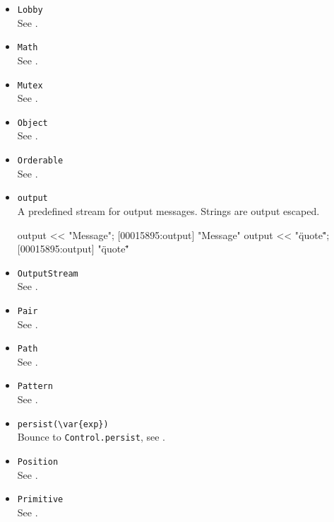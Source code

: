 \begin{itemize}
\item \lstinline|Lobby|\\
  See .

\item \lstinline|Math|\\
  See .

\item \lstinline|Mutex|\\
  See .

\item \lstinline|Object|\\
  See .

\item \lstinline|Orderable|\\
  See .

\item \lstinline|output|\\
  A predefined stream for output messages.  Strings are output
  escaped.
\begin{urbiscript}[firstnumber=last]
output << "Message";
[00015895:output] "Message"
output << "\"quote\"";
[00015895:output] "\"quote\""
\end{urbiscript}

\item \lstinline|OutputStream|\\
  See .

\item \lstinline|Pair|\\
  See .

\item \lstinline|Path|\\
  See .

\item \lstinline|Pattern|\\
  See .

\item \lstinline|persist(\var{exp})|\\
  Bounce to \lstinline|Control.persist|, see .

\item \lstinline|Position|\\
  See .

\item \lstinline|Primitive|\\
  See .


\end{itemize}
